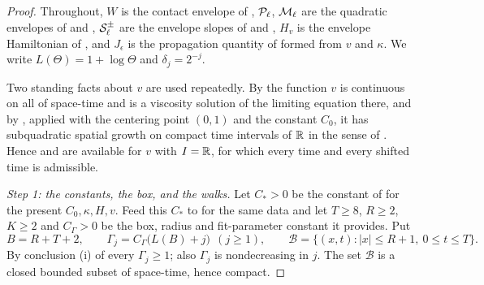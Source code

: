 \begin{proof}
Throughout, $W$ is the contact envelope of ,
$\mathcal{P}_\ell$, $\mathcal{M}_\ell$ are the quadratic envelopes of 
and , $\mathcal{S}^\pm_\ell$ are the envelope slopes of
 and , $H_v$ is the envelope Hamiltonian
of , and $J_\epsilon$ is the propagation quantity of
 formed from $v$ and $\kappa$. We write $L(\Theta)=1+\log\Theta$
and $\delta_j=2^{-j}$.

Two standing facts about $v$ are used repeatedly. By  the
function $v$ is continuous on all of space-time and is a viscosity solution of
the limiting equation there, and by , applied with
the centering point $(0,1)$ and the constant $C_0$, it has subquadratic spatial
growth on compact time intervals of $\mathbb{R}$ in the sense of
. Hence  and
 are available for $v$ with $I=\mathbb{R}$, for which
every time and every shifted time is admissible.

\emph{Step 1: the constants, the box, and the walks.}
Let $C_*>0$ be the constant of  for the present
$C_0,\kappa,H,v$. Feed this $C_*$ to  for the same
data and let $T\ge8$, $R\ge2$, $K\ge2$ and $C_\Gamma>0$ be the box, radius and
fit-parameter constant it provides. Put
\[
  B=R+T+2,\qquad \Gamma_j=C_\Gamma\bigl(L(B)+j\bigr)\ \ (j\ge1),\qquad
  \mathcal B=\{(x,t):|x|\le R+1,\ 0\le t\le T\}.
\]
By conclusion (i) of  every $\Gamma_j\ge1$; also
$\Gamma_j$ is nondecreasing in $j$. The set $\mathcal B$ is a closed bounded
subset of space-time, hence compact.


\end{proof}
